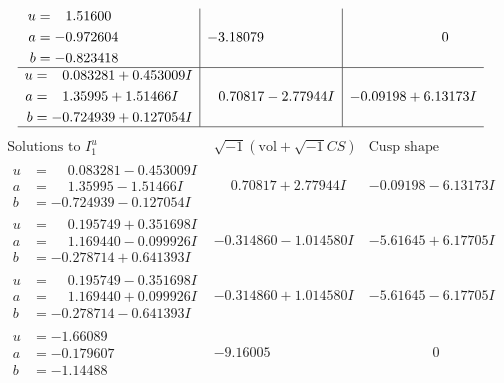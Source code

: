 \documentclass[1p]{elsarticle_modified}
\theoremstyle{definition}
\newcommand{\I}{\sqrt{-1}}
\begin{document}
$$\begin{array}{c|c|c}
\begin{aligned}
u &= \phantom{-}1.51600\phantom{ +0.000000I} \\
a &= -0.972604\phantom{ +0.000000I} \\
b &= -0.823418\phantom{ +0.000000I}\end{aligned}
 & -3.18079\phantom{ +0.000000I} & \phantom{-0.000000 } 0 \\ \hline\begin{aligned}
u &= \phantom{-}0.083281 + 0.453009 I \\
a &= \phantom{-}1.35995 + 1.51466 I \\
b &= -0.724939 + 0.127054 I\end{aligned}
 & \phantom{-}0.70817 - 2.77944 I & -0.09198 + 6.13173 I\\
 \hline 
 \end{array}$$\newpage$$\begin{array}{c|c|c}  
\text{Solutions to }I^u_{1}& \I (\text{vol} + \sqrt{-1}CS) & \text{Cusp shape}\\
 \hline 
\begin{aligned}
u &= \phantom{-}0.083281 - 0.453009 I \\
a &= \phantom{-}1.35995 - 1.51466 I \\
b &= -0.724939 - 0.127054 I\end{aligned}
 & \phantom{-}0.70817 + 2.77944 I & -0.09198 - 6.13173 I \\ \hline\begin{aligned}
u &= \phantom{-}0.195749 + 0.351698 I \\
a &= \phantom{-}1.169440 - 0.099926 I \\
b &= -0.278714 + 0.641393 I\end{aligned}
 & -0.314860 - 1.014580 I & -5.61645 + 6.17705 I \\ \hline\begin{aligned}
u &= \phantom{-}0.195749 - 0.351698 I \\
a &= \phantom{-}1.169440 + 0.099926 I \\
b &= -0.278714 - 0.641393 I\end{aligned}
 & -0.314860 + 1.014580 I & -5.61645 - 6.17705 I \\ \hline\begin{aligned}
u &= -1.66089\phantom{ +0.000000I} \\
a &= -0.179607\phantom{ +0.000000I} \\
b &= -1.14488\phantom{ +0.000000I}\end{aligned}
 & -9.16005\phantom{ +0.000000I} & \phantom{-0.000000 } 0 \\ \hline\begin{aligned}

\end{aligned}
\end{array}$$
\end{document}
